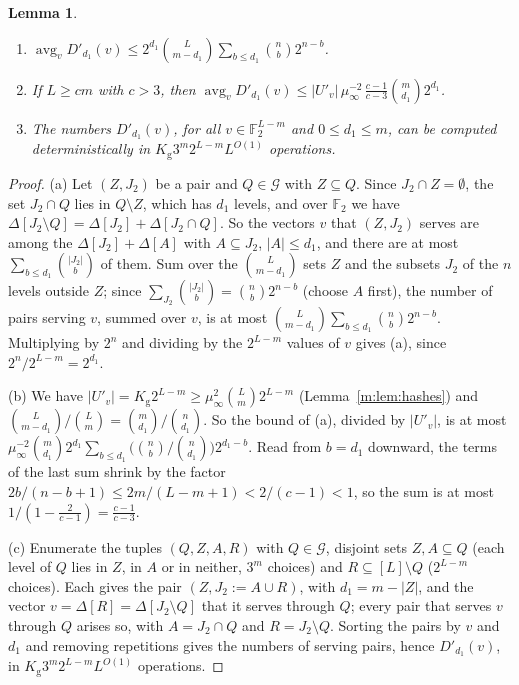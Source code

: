 \documentclass[11pt]{article}
\newtheorem{lemma}[theorem]{Lemma}
\theoremstyle{definition}
\theoremstyle{remark}
\newcommand{\F}{\mathbb{F}_2}
\newcommand{\Qg}{\mathcal{G}}
\newcommand{\Kg}{K_{\mathrm g}}
\begin{document}
\begin{lemma}\label{m:lem:firsthalf}
\begin{enumerate}[label=(\alph*),nosep]
\item $\operatorname{avg}_vD'_{d_1}(v)\le2^{d_1}\binom L{m-d_1}\sum_{b\le d_1}\binom nb2^{n-b}$.
\item If $L\ge cm$ with $c>3$, then $\operatorname{avg}_vD'_{d_1}(v)\le|U'_v|\,\mu_\infty^{-2}\,\frac{c-1}{c-3}\binom m{d_1}2^{d_1}$.
\item The numbers $D'_{d_1}(v)$, for all $v\in\F^{L-m}$ and $0\le d_1\le m$, can be computed deterministically in $\Kg3^m2^{L-m}L^{O(1)}$ operations.
\end{enumerate}
\end{lemma}

\begin{proof}
(a) Let $(Z,J_2)$ be a pair and $Q\in\Qg$ with $Z\subseteq Q$. Since $J_2\cap Z=\emptyset$, the set $J_2\cap Q$ lies in $Q\setminus Z$, which has $d_1$ levels, and over $\F$ we have $\Delta[J_2\setminus Q]=\Delta[J_2]+\Delta[J_2\cap Q]$. So the vectors $v$ that $(Z,J_2)$ serves are among the $\Delta[J_2]+\Delta[A]$ with $A\subseteq J_2$, $|A|\le d_1$, and there are at most $\sum_{b\le d_1}\binom{|J_2|}b$ of them. Sum over the $\binom L{m-d_1}$ sets $Z$ and the subsets $J_2$ of the $n$ levels outside $Z$; since $\sum_{J_2}\binom{|J_2|}b=\binom nb2^{n-b}$ (choose $A$ first), the number of pairs serving $v$, summed over $v$, is at most $\binom L{m-d_1}\sum_{b\le d_1}\binom nb2^{n-b}$. Multiplying by $2^n$ and dividing by the $2^{L-m}$ values of $v$ gives (a), since $2^n/2^{L-m}=2^{d_1}$.

(b) We have $|U'_v|=\Kg2^{L-m}\ge\mu_\infty^2\binom Lm2^{L-m}$ (Lemma~\ref{m:lem:hashes}) and $\binom L{m-d_1}/\binom Lm=\binom m{d_1}/\binom n{d_1}$. So the bound of (a), divided by $|U'_v|$, is at most $\mu_\infty^{-2}\binom m{d_1}2^{d_1}\sum_{b\le d_1}\big(\binom nb/\binom n{d_1}\big)2^{d_1-b}$. Read from $b=d_1$ downward, the terms of the last sum shrink by the factor $2b/(n-b+1)\le2m/(L-m+1)<2/(c-1)<1$, so the sum is at most $1/(1-\frac2{c-1})=\frac{c-1}{c-3}$.

(c) Enumerate the tuples $(Q,Z,A,R)$ with $Q\in\Qg$, disjoint sets $Z,A\subseteq Q$ (each level of $Q$ lies in $Z$, in $A$ or in neither, $3^m$ choices) and $R\subseteq[L]\setminus Q$ ($2^{L-m}$ choices). Each gives the pair $(Z,J_2:=A\cup R)$, with $d_1=m-|Z|$, and the vector $v=\Delta[R]=\Delta[J_2\setminus Q]$ that it serves through $Q$; every pair that serves $v$ through $Q$ arises so, with $A=J_2\cap Q$ and $R=J_2\setminus Q$. Sorting the pairs by $v$ and $d_1$ and removing repetitions gives the numbers of serving pairs, hence $D'_{d_1}(v)$, in $\Kg3^m2^{L-m}L^{O(1)}$ operations.
\end{proof}
\end{document}

